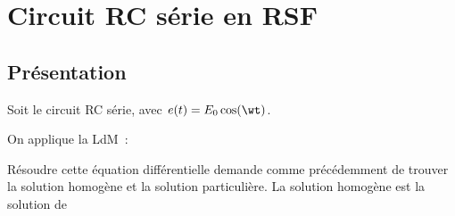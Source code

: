 \documentclass[../../main/main.tex]{subfiles}
\begin{document}
\section{Circuit RC série en RSF}
\subsection{Présentation}
\noindent
\begin{minipage}[t]{.45\linewidth}
	Soit le circuit RC série, avec $e(t) = E_0\cos(\wt)$.
	\begin{center}
	\end{center}
\end{minipage}
\hfill
\begin{minipage}[t]{.5\linewidth}
	On applique la LdM~:
\end{minipage}
\bigbreak
Résoudre cette équation différentielle demande comme précédemment de trouver la
solution homogène et la solution particulière. La solution homogène est la
solution de
\end{document}
